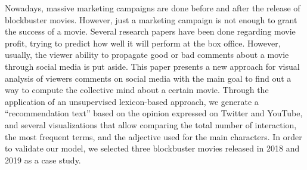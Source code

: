 Nowadays, massive marketing campaigns are done before and after the release of blockbuster movies. However, just a marketing campaign is not enough to grant the success of a movie.  Several research papers have been done regarding movie profit, trying to predict how well it will perform at the box office. However, usually, the viewer ability to propagate good or bad comments about a movie through social media is put aside. This paper presents a new approach for visual analysis of viewers comments on social media with the main goal to find out a way to compute the collective mind about a certain movie. Through the application of an unsupervised lexicon-based approach, we generate a ``recommendation text'' based on the opinion expressed on Twitter and YouTube, and several visualizations that allow comparing the total number of interaction, the most frequent terms, and the adjective used for the main characters. In order to validate our model, we selected three blockbuster movies released in 2018 and 2019 as a case study.
